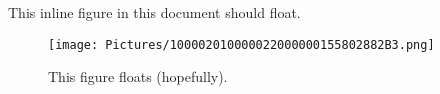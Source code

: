 This inline figure in this document should float.

\begin{figure}
\centering
\texttt{[image: Pictures/100002010000022000000155802882B3.png]}
\caption{ This figure floats (hopefully).}
\end{figure}
